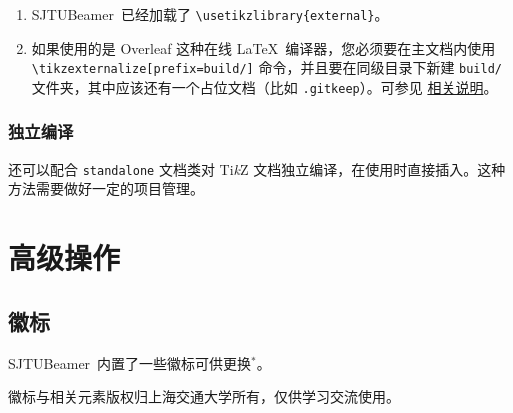 \documentclass[
    UTF8,
    heading=true,
    12pt,
    a4paper
]{ctexrep}
\newenvironment{commentlist}{\begin{enumerate}\small}{\end{enumerate}}
\newcommand{\cls}[1]{\texttt{#1}}
\def\themename{\textsf{SJTUBeamer}}
\begin{document}
\begin{commentlist}
  \item \themename\ 已经加载了 \verb"\usetikzlibrary{external}"。
  \item[\faExclamationTriangle] 如果使用的是 Overleaf 这种在线 \LaTeX\ 编译器，您必须要在主文档内使用 \verb"\tikzexternalize[prefix=build/]" 命令，并且要在同级目录下新建 \verb"build/" 文件夹，其中应该还有一个占位文档（比如 \verb".gitkeep"）。可参见 \href{https://www.overleaf.com/learn/latex/Questions/I_have_a_lot_of_tikz%2C_matlab2tikz_or_pgfplots_figures%2C_so_I%27m_getting_a_compilation_timeout._Can_I_externalise_my_figures%3F}{相关说明}。
\end{commentlist}

\section{独立编译}

还可以配合 \cls{standalone} 文档类对 Ti\emph{k}Z 文档独立编译，在使用时直接插入。这种方法需要做好一定的项目管理。


\part{高级操作}
\chapter{徽标}

\themename\ 内置了一些徽标可供更换$^*$。

\faInfoCircle 徽标与相关元素版权归上海交通大学所有，仅供学习交流使用。

\begin{tcbitemize}[raster rows=2, raster columns=3, raster every box/.style={center title, valign=center, halign=center,fonttitle=\ttfamily,colback=white}]
  \tcbitem[raster multicolumn=2,blankest]
  \begin{tcbitemize}[raster columns=2]
    \tcbitem[title={\textbackslash{}zhlogo}]
    \moveleft 0.3cm\hbox{\resizebox{!}{1cm}{\zhlogo}}
    \tcbitem[title={\textbackslash{}enlogo}]
    \moveleft 0.3cm\hbox{\resizebox{!}{1cm}{\enlogo}}
    \tcbitem[title={\textbackslash{}sjtubadge},height=3.5cm]
    \resizebox{!}{2cm}{\sjtubadge\ }
    \tcbitem[title={\textbackslash{}dlogo},height=3.5cm]
    \resizebox{3cm}{!}{\dlogo\ }
  \end{tcbitemize}
  \tcbitem[title={\textbackslash{}vlogo}] \resizebox{!}{4.8cm}{\vlogo\ }
\end{tcbitemize}
\end{document}
